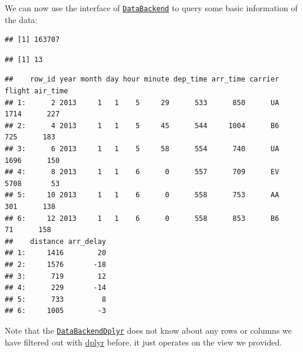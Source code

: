\documentclass[
]{scrbook}
\newenvironment{Shaded}{\begin{snugshade}}{\end{snugshade}}
\newcommand{\FunctionTok}[1]{\textcolor[rgb]{0.00,0.00,0.00}{#1}}
\newcommand{\NormalTok}[1]{#1}
\newcommand{\SpecialCharTok}[1]{\textcolor[rgb]{0.00,0.00,0.00}{#1}}
\renewenvironment{Shaded} {\begin{snugshade}\small} {\end{snugshade}}
\begin{document}
We can now use the interface of \href{https://mlr3.mlr-org.com/reference/DataBackend.html}{\texttt{DataBackend}} to query some basic information of the data:

\begin{Shaded}
\end{Shaded}

\begin{verbatim}
## [1] 163707
\end{verbatim}

\begin{Shaded}
\end{Shaded}

\begin{verbatim}
## [1] 13
\end{verbatim}

\begin{Shaded}
\end{Shaded}

\begin{verbatim}
##    row_id year month day hour minute dep_time arr_time carrier flight air_time
## 1:      2 2013     1   1    5     29      533      850      UA   1714      227
## 2:      4 2013     1   1    5     45      544     1004      B6    725      183
## 3:      6 2013     1   1    5     58      554      740      UA   1696      150
## 4:      8 2013     1   1    6      0      557      709      EV   5708       53
## 5:     10 2013     1   1    6      0      558      753      AA    301      138
## 6:     12 2013     1   1    6      0      558      853      B6     71      158
##    distance arr_delay
## 1:     1416        20
## 2:     1576       -18
## 3:      719        12
## 4:      229       -14
## 5:      733         8
## 6:     1005        -3
\end{verbatim}

Note that the \href{https://mlr3db.mlr-org.com/reference/DataBackendDplyr.html}{\texttt{DataBackendDplyr}} does not know about any rows or columns we have filtered out with \href{https://cran.r-project.org/package=dplyr}{dplyr} before, it just operates on the view we provided.
\end{document}
